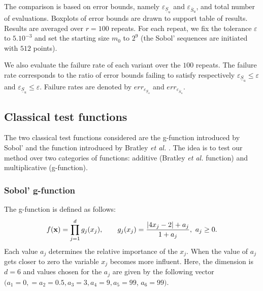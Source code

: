The comparison is based on error bounds, namely $\varepsilon_{\underline{S}_u}$ and $\varepsilon_{\overline{S}_u}$, and total number of evaluations. Boxplots of error bounds are drawn to support table of results. Results are averaged over $r=100$ repeats. For each repeat, we fix the tolerance $\varepsilon$ to $5.10^{-3}$ and set the starting size $m_0$ to $2^9$ (the Sobol' sequences are initiated with $512$ points).

We also evaluate the failure rate of each variant over the $100$ repeats. The failure rate corresponds to the ratio of error bounds failing to satisfy respectively $\varepsilon_{\underline{S}_u} \leq \varepsilon$ and $\varepsilon_{\underline{S}_u} \leq \varepsilon$. Failure rates are denoted by ${err}_{\varepsilon_{\underline{S}_u}}$ and  ${err}_{\varepsilon_{\overline{S}_u}}$.

%

\subsection{Classical test functions}
\label{sec:5.1}

The two classical test functions considered are the g-function introduced by Sobol' \cite{Sobol'} and the function introduced by Bratley \textit{et al.} \cite{Bratley}. The idea is to test our method over two categories of functions: additive (Bratley \textit{et al.} function) and multiplicative (g-function).

\subsubsection{Sobol' g-function}

The g-function is defined as follows:
\begin{equation*}
f(\boldsymbol{\mathbf{x}})= \prod \limits_{j=1}^{d}g_j(x_j), \qquad g_j(x_j)=\frac{\left |4x_j-2 \right | + a_j}{1 + a_j}, \ a_j \geq 0.
\end{equation*}
Each value $a_j$ determines the relative importance of the $x_j$. When the value of $a_j$ gets closer to zero the variable $x_j$ becomes more influent. Here, the dimension is $d=6$ and values chosen for the $a_j$ are given by the following vector $(a_1=0,=a_2=0.5, a_3=3, a_4=9, a_5=99$, $a_6=99)$.

